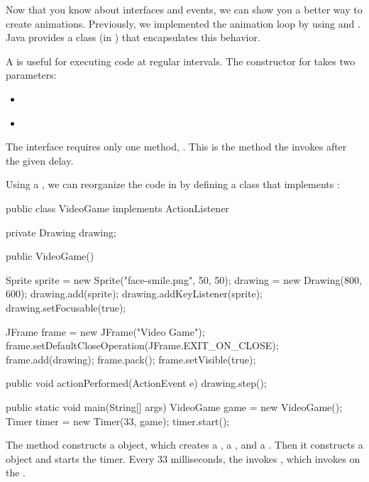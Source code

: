 

Now that you know about interfaces and events, we can show you a better way to create animations.
Previously, we implemented the animation loop by using  and .
Java provides a  class (in ) that encapsulates this behavior.

A  is useful for executing code at regular intervals.
The constructor for  takes two parameters:

\begin{itemize}
\item {} {\tt ~~~~~~~~~~~~~~~} 

\item {} {\tt ~} 
\end{itemize}

The  interface requires only one method, .
This is the method the  invokes after the given delay.

Using a , we can reorganize the code in  by defining a class that implements :

\begin{code}
public class VideoGame implements ActionListener {
    private Drawing drawing;

    public VideoGame() {
        Sprite sprite = new Sprite("face-smile.png", 50, 50);
        drawing = new Drawing(800, 600);
        drawing.add(sprite);
        drawing.addKeyListener(sprite);
        drawing.setFocusable(true);

        JFrame frame = new JFrame("Video Game");
        frame.setDefaultCloseOperation(JFrame.EXIT_ON_CLOSE);
        frame.add(drawing);
        frame.pack();
        frame.setVisible(true);
    }

    public void actionPerformed(ActionEvent e) {
        drawing.step();
    }

    public static void main(String[] args) {
        VideoGame game = new VideoGame();
        Timer timer = new Timer(33, game);
        timer.start();
    }
}
\end{code}

The  method constructs a  object, which creates a , a , and a .
Then it constructs a  object and starts the timer.
Every 33 milliseconds, the  invokes , which invokes  on the .

